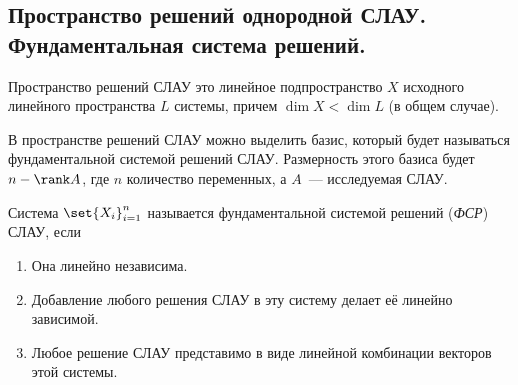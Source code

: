 \subsection{%
  Пространство решений однородной СЛАУ. Фундаментальная система решений.%
}

\begin{remark}
  Пространство решений СЛАУ это линейное подпространство \(X\) исходного
  линейного пространства \(L\) системы, причем \(\dim X < \dim L\) (в общем
  случае).
\end{remark}

В пространстве решений СЛАУ можно выделить базис, который будет называться
фундаментальной системой решений СЛАУ. Размерность этого базиса будет \(n -
\rank A\), где \(n\) количество переменных, а \(A\)~--- исследуемая СЛАУ.

\begin{definition}
  Система \(\set{X_i}_{i = 1}^n\) называется фундаментальной системой решений
  (\textit{ФСР}) СЛАУ, если
  
  \begin{enumerate}
  \item
    Она линейно независима.
    
  \item
    Добавление любого решения СЛАУ в эту систему делает её линейно зависимой.
    
  \item
    Любое решение СЛАУ представимо в виде линейной комбинации векторов этой
    системы.
  \end{enumerate}
\end{definition}
